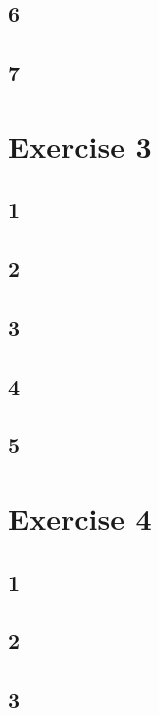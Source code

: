 \documentclass{article}
\begin{document}
    \subsection*{6}
    
    \subsection*{7}
    
  \section*{Exercise 3}
    \subsection*{1}
    
    \subsection*{2}
    
    \subsection*{3}
    
    \subsection*{4}
    
    \subsection*{5}
    
  \section*{Exercise 4}
    \subsection*{1}
    
    \subsection*{2}
    
    \subsection*{3}
    
\end{document}
